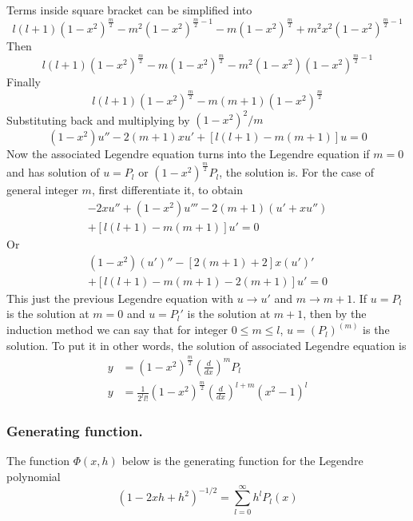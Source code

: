 \documentclass[../main.tex]{subfiles}
\begin{document}
Terms inside square bracket can be simplified into
\begin{equation*}
    l(l+1)(1-x^2)^{\frac{m}{2}}-m^2(1-x^2)^{\frac{m}{2}-1} -m(1-x^2)^{\frac{m}{2}} +m^2x^2(1-x^2)^{\frac{m}{2}-1}
\end{equation*}
Then
\begin{equation*}
    l(l+1)(1-x^2)^{\frac{m}{2}}-m(1-x^2)^{\frac{m}{2}} -m^2(1-x^2)(1-x^2)^{\frac{m}{2}-1}
\end{equation*}
Finally
\begin{equation*}
    l(l+1)(1-x^2)^{\frac{m}{2}} -m(m+1)(1-x^2)^{\frac{m}{2}}
\end{equation*}
Substituting back and multiplying by $(1-x^2)^2/m$
\begin{equation*}
    (1-x^2)u''-2(m+1)xu'+\left[l(l+1)-m(m+1)\right]u=0
\end{equation*}
Now the associated Legendre equation turns into the Legendre equation if $m=0$ and has solution of $u=P_l$ or $(1-x^2)^{\frac{m}{2}}P_l$,  the solution is.
For the case of general integer $m$, first differentiate it, to obtain
\begin{gather*}
    -2xu'' +(1-x^2)u'''-2(m+1)(u'+xu'')\\
    +\left[l(l+1)-m(m+1)\right]u'=0
\end{gather*}
Or
\begin{gather*}
    (1-x^2)(u')''-[2(m+1)+2]x(u')'\\
    +\left[l(l+1)-m(m+1)-2(m+1)\right]u'=0
\end{gather*}
This just the previous Legendre equation with $u\rightarrow u'$ and $m\rightarrow m+1$.
If $u=P_l$ is the solution at $m=0$ and $u=P_l'$ is the solution at $m+1$, then by the induction method we can say that for integer $0\leq m\leq l$, $u=(P_l)^{(m)}$ is the solution.
To put it in other words, the solution of associated Legendre equation is
\begin{align*}
    y & =(1-x^2)^{\frac{m}{2}}\left(\frac{d}{dx}\right)^m P_l                         \\
    y & =\frac{1}{2^ll!}(1-x^2)^{\frac{m}{2}}\left(\frac{d}{dx}\right)^{l+m}(x^2-1)^l
\end{align*}


\subsubsection*{Generating function.} The function $\Phi(x,h)$ below is the generating function for the Legendre polynomial
\begin{equation*}
    (1-2xh+h^2)^{-1/2}=\sum_{l=0}^{\infty}h^lP_l(x)
\end{equation*}
\end{document}
